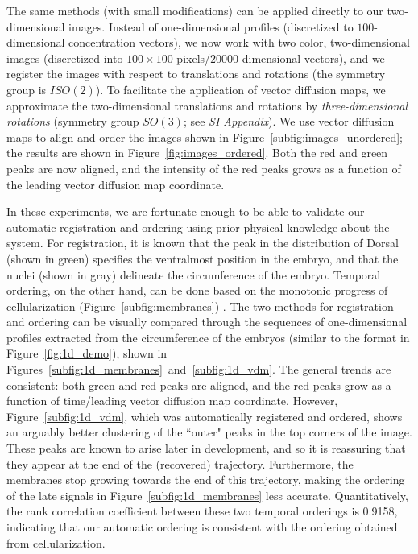 \documentclass{pnastwo}
\begin{document}
\begin{article}
The same methods (with small modifications) can be applied directly to our two-dimensional images.
%
Instead of one-dimensional profiles (discretized to $100$-dimensional concentration vectors), we now work with
two color, two-dimensional images (discretized into $100 \times 100$ pixels/$20000$-dimensional vectors), and we register the images with respect to translations and rotations (the symmetry group is $ISO(2)$).
%
To facilitate the application of vector diffusion maps, we approximate the two-dimensional translations and rotations by {\it three-dimensional rotations} (symmetry group $SO(3)$; see {\it SI Appendix}).
%
We use vector diffusion maps to align and order the images shown in Figure~\ref{subfig:images_unordered};
the results are shown in Figure~\ref{fig:images_ordered}.
%
Both the red and green peaks are now aligned, and the intensity of the red peaks grows as a function of the leading vector diffusion map coordinate.

In these experiments, we are fortunate enough to be able to validate our  automatic registration and ordering using prior physical knowledge about the system.
%
For registration, it is known that the peak in the distribution of Dorsal (shown in green) specifies the ventralmost position in the embryo, and that the nuclei (shown in gray) delineate the circumference of the embryo.
%
%
Temporal ordering, on the other hand, can be done based on the monotonic progress of cellularization (Figure~\ref{subfig:membranes}) \cite{figard2013plasma}.%
%
The two methods for registration and ordering can be visually compared through the sequences of one-dimensional profiles extracted from the circumference of the embryos (similar to the format in Figure~\ref{fig:1d_demo}), shown in Figures~\ref{subfig:1d_membranes}~and~\ref{subfig:1d_vdm}.
%
The general trends are consistent:
both green  and red peaks are aligned, and the red peaks grow as a function of time/leading vector diffusion map coordinate.
%
However, Figure~\ref{subfig:1d_vdm}, which was automatically registered and ordered, shows an arguably better clustering of the ``outer" peaks in the top corners of the image.
%
%
These peaks are known to arise later in development, and so it is reassuring that they appear at the end of the (recovered) trajectory.
%
Furthermore, the membranes stop growing towards the end of this trajectory, making the ordering of the late signals in Figure~\ref{subfig:1d_membranes} less accurate.
%
Quantitatively, the rank correlation coefficient between these two temporal orderings is 0.9158, indicating that our automatic ordering is consistent with the ordering obtained from cellularization.


\end{article}
\end{document}
